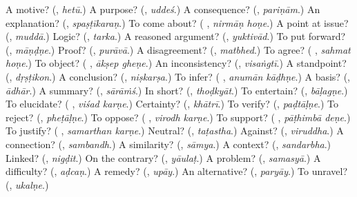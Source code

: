 \begin{tcolorbox}[breakable,colback=teal!4,colframe=teal!35!black,title={Before you move on}]
A motive? (\textbf{}, \emph{hetū}.) A purpose? (\textbf{}, \emph{uddeś}.) A consequence? (\textbf{}, \emph{pariṇām}.) An explanation? (\textbf{}, \emph{spaṣṭīkaraṇ}.) To come about? (\textbf{ }, \emph{nirmāṇ hoṇe}.) A point at issue? (\textbf{}, \emph{muddā}.) Logic? (\textbf{}, \emph{tarka}.) A reasoned argument? (\textbf{}, \emph{yuktivād}.) To put forward? (\textbf{}, \emph{māṇḍṇe}.) Proof? (\textbf{}, \emph{purāvā}.) A disagreement? (\textbf{}, \emph{matbhed}.) To agree? (\textbf{ }, \emph{sahmat hoṇe}.) To object? (\textbf{ }, \emph{ākṣep gheṇe}.) An inconsistency? (\textbf{}, \emph{visaṅgtī}.) A standpoint? (\textbf{}, \emph{dṛṣṭikon}.) A conclusion? (\textbf{}, \emph{niṣkarṣa}.) To infer? (\textbf{ }, \emph{anumān kāḍhṇe}.) A basis? (\textbf{}, \emph{ādhār}.) A summary? (\textbf{}, \emph{sārāṁś}.) In short? (\textbf{}, \emph{thoḍkyāt}.) To entertain? (\textbf{}, \emph{bāḷagṇe}.) To elucidate? (\textbf{ }, \emph{viśad karṇe}.) Certainty? (\textbf{}, \emph{khātrī}.) To verify? (\textbf{}, \emph{paḍtāḷṇe}.) To reject? (\textbf{}, \emph{pheṭāḷṇe}.) To oppose? (\textbf{ }, \emph{virodh karṇe}.) To support? (\textbf{ }, \emph{pāṭhimbā deṇe}.) To justify? (\textbf{ }, \emph{samarthan karṇe}.) Neutral? (\textbf{}, \emph{taṭastha}.) Against? (\textbf{}, \emph{viruddha}.) A connection? (\textbf{}, \emph{sambandh}.) A similarity? (\textbf{}, \emph{sāmya}.) A context? (\textbf{}, \emph{sandarbha}.) Linked? (\textbf{}, \emph{nigḍit}.) On the contrary? (\textbf{}, \emph{yāulaṭ}.) A problem? (\textbf{}, \emph{samasyā}.) A difficulty? (\textbf{}, \emph{aḍcaṇ}.) A remedy? (\textbf{}, \emph{upāy}.) An alternative? (\textbf{}, \emph{paryāy}.) To unravel? (\textbf{}, \emph{ukalṇe}.)
\end{tcolorbox}
